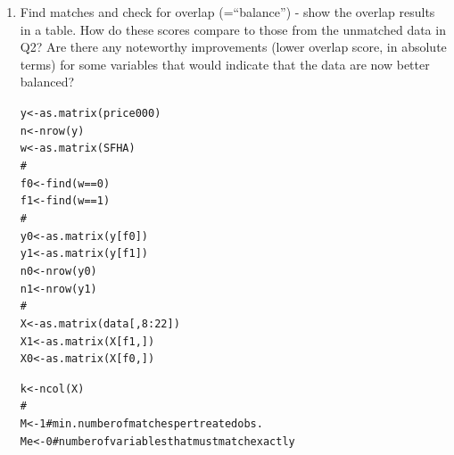 \documentclass[11pt,reqno]{amsart}\usepackage[]{graphicx}\usepackage[]{color}
\makeatletter
\newcommand{\hlnum}[1]{\textcolor[rgb]{0.063,0.58,0.627}{#1}}%
\newcommand{\hlcom}[1]{\textcolor[rgb]{0.588,0.588,0.588}{#1}}%
\newcommand{\hlopt}[1]{\textcolor[rgb]{0.196,0.196,0.196}{#1}}%
\newcommand{\hlstd}[1]{\textcolor[rgb]{0.196,0.196,0.196}{#1}}%
\newcommand{\hlkwb}[1]{\textcolor[rgb]{0.627,0,0.314}{#1}}%
\newcommand{\hlkwd}[1]{\textcolor[rgb]{0.78,0.227,0.412}{#1}}%
\newenvironment{kframe}{%
 \def\at@end@of@kframe{}%
 \ifinner\ifhmode%
  \def\at@end@of@kframe{\end{minipage}}%
  \begin{minipage}{\columnwidth}%
 \fi\fi%
 \def\FrameCommand##1{\hskip\@totalleftmargin \hskip-\fboxsep
 \colorbox{shadecolor}{##1}\hskip-\fboxsep
     \hskip-\linewidth \hskip-\@totalleftmargin \hskip\columnwidth}%
 \MakeFramed {\advance\hsize-\width
   \@totalleftmargin\z@ \linewidth\hsize
   \@setminipage}}%
 {\par\unskip\endMakeFramed%
 \at@end@of@kframe}
\makeatother
\begin{document}
\begin{enumerate}
\item 
Find matches and check for overlap (=``balance'') - show the overlap results in a table. How do these scores compare to those from the unmatched data in Q2? Are there any noteworthy improvements (lower overlap score, in absolute terms) for some variables that would indicate that the data are now better balanced?\\

\begin{kframe}
\begin{alltt}
\hlstd{y} \hlkwb{<-} \hlkwd{as.matrix}\hlstd{(price000)}
\hlstd{n} \hlkwb{<-} \hlkwd{nrow}\hlstd{(y)}
\hlstd{w} \hlkwb{<-} \hlkwd{as.matrix}\hlstd{(SFHA)}
\hlcom{#}
\hlstd{f0} \hlkwb{<-} \hlkwd{find}\hlstd{(w} \hlopt{==} \hlnum{0}\hlstd{)}
\hlstd{f1} \hlkwb{<-} \hlkwd{find}\hlstd{(w} \hlopt{==} \hlnum{1}\hlstd{)}
\hlcom{#}
\hlstd{y0} \hlkwb{<-} \hlkwd{as.matrix}\hlstd{(y[f0])}
\hlstd{y1} \hlkwb{<-} \hlkwd{as.matrix}\hlstd{(y[f1])}
\hlstd{n0} \hlkwb{<-} \hlkwd{nrow}\hlstd{(y0)}
\hlstd{n1} \hlkwb{<-} \hlkwd{nrow}\hlstd{(y1)}
\hlcom{#}
\hlstd{X} \hlkwb{<-} \hlkwd{as.matrix}\hlstd{(data[,} \hlnum{8}\hlopt{:}\hlnum{22}\hlstd{])}
\hlstd{X1} \hlkwb{<-} \hlkwd{as.matrix}\hlstd{(X[f1, ])}
\hlstd{X0} \hlkwb{<-} \hlkwd{as.matrix}\hlstd{(X[f0, ])}

\hlstd{k} \hlkwb{<-} \hlkwd{ncol}\hlstd{(X)}
\hlcom{#}
\hlstd{M} \hlkwb{<-} \hlnum{1} \hlcom{#min. number of matches per treated obs.}
\hlstd{Me} \hlkwb{<-} \hlnum{0} \hlcom{#number of variables that must match exactly}
\end{alltt}
\end{kframe}


\end{enumerate}
\end{document}
